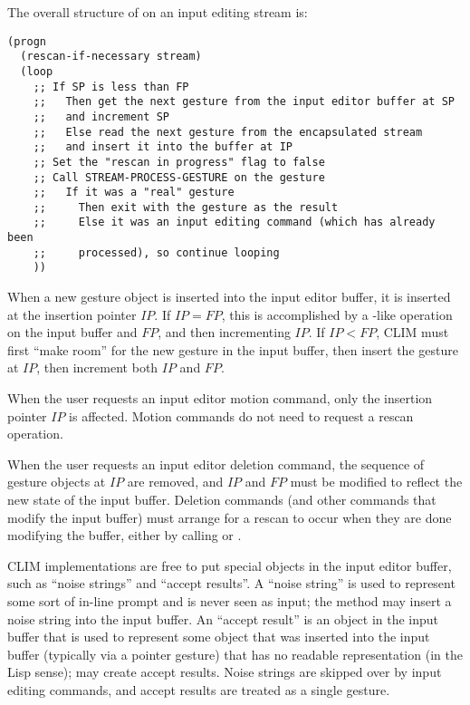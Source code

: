 The overall structure of  on an input editing stream is:

\begin{verbatim}
(progn
  (rescan-if-necessary stream)
  (loop
    ;; If SP is less than FP
    ;;   Then get the next gesture from the input editor buffer at SP
    ;;   and increment SP
    ;;   Else read the next gesture from the encapsulated stream
    ;;   and insert it into the buffer at IP
    ;; Set the "rescan in progress" flag to false
    ;; Call STREAM-PROCESS-GESTURE on the gesture
    ;;   If it was a "real" gesture
    ;;     Then exit with the gesture as the result
    ;;     Else it was an input editing command (which has already been
    ;;     processed), so continue looping
    ))
\end{verbatim}

When a new gesture object is inserted into the input editor buffer, it is
inserted at the insertion pointer $IP$.  If $IP = FP$, this is accomplished by a
-like operation on the input buffer and $FP$, and then
incrementing $IP$.  If $IP < FP$, CLIM must first ``make room'' for the new
gesture in the input buffer, then insert the gesture at $IP$, then increment
both $IP$ and $FP$.

When the user requests an input editor motion command, only the insertion
pointer $IP$ is affected.  Motion commands do not need to request a rescan
operation.

When the user requests an input editor deletion command, the sequence of gesture
objects at $IP$ are removed, and $IP$ and $FP$ must be modified to reflect the
new state of the input buffer.  Deletion commands (and other commands that
modify the input buffer) must arrange for a rescan to occur when they are done
modifying the buffer, either by calling  or
.

CLIM implementations are free to put special objects in the input editor buffer,
such as ``noise strings'' and ``accept results''.  A ``noise string'' is used to
represent some sort of in-line prompt and is never seen as input; the
 method may insert a noise string into the input buffer.
An ``accept result'' is an object in the input buffer that is used to represent
some object that was inserted into the input buffer (typically via a pointer
gesture) that has no readable representation (in the Lisp sense);
 may create accept results.  Noise strings are
skipped over by input editing commands, and accept results are treated as a
single gesture.


